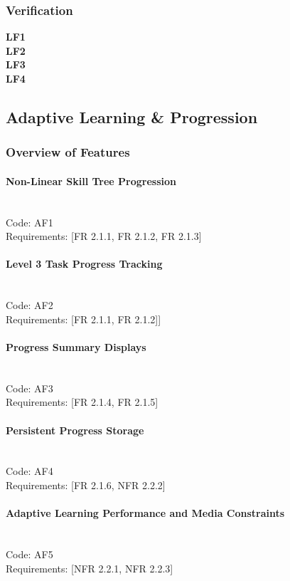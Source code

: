 \documentclass{article}
\begin{document}
\subsubsection{Verification}
\textbf{LF1} \mbox{} \\
\textbf{LF2} \mbox{} \\
\textbf{LF3} \mbox{} \\
\textbf{LF4} \mbox{} \\



\subsection{Adaptive Learning \& Progression} %
\subsubsection{Overview of Features}
\paragraph{Non-Linear Skill Tree Progression} \mbox{} \\
\noindent Code: AF1 \\
\noindent Requirements: [FR 2.1.1, FR 2.1.2, FR 2.1.3]

\paragraph{Level 3 Task Progress Tracking} \mbox{} \\
\noindent Code: AF2 \\
\noindent Requirements: [FR 2.1.1, FR 2.1.2]]

\paragraph{Progress Summary Displays} \mbox{} \\
\noindent Code: AF3 \\
\noindent Requirements: [FR 2.1.4, FR 2.1.5]

\paragraph{Persistent Progress Storage } \mbox{} \\
\noindent Code: AF4 \\
\noindent Requirements: [FR 2.1.6, NFR 2.2.2]

\paragraph{Adaptive Learning Performance and Media Constraints} \mbox{} \\
\noindent Code: AF5 \\
\noindent Requirements: [NFR 2.2.1, NFR 2.2.3]
\end{document}
